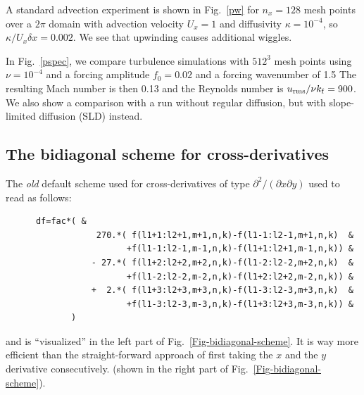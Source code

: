 \documentclass[\mydriver,12pt,twoside,notitlepage,a4paper]{article}
\begin{document}
A standard advection experiment is shown in Fig.~\ref{pw}
for $n_x=128$ mesh points over a $2\pi$ domain with
advection velocity $U_x=1$ and diffusivity $\kappa=10^{-4}$,
so $\kappa/U_x\delta x=0.002$.
We see that upwinding causes additional wiggles.

In Fig.~\ref{pspec}, we compare turbulence simulations with $512^3$
mesh points using $\nu=10^{-4}$ and a forcing amplitude $f_0=0.02$
and a forcing wavenumber of 1.5
The resulting Mach number is then 0.13 and the Reynolds number
is $u_{\rm rms}/\nu k_{\rm f}=900$.
We also show a comparison with a run without regular diffusion, but
with slope-limited diffusion (SLD) instead.

\subsection{The bidiagonal scheme for cross-derivatives}
\label{Bidiagonal}

The {\em old} default scheme used for cross-derivatives of type
$\partial^2/(\partial x \partial y)$ used to read as follows:
\begin{verbatim}
      df=fac*( &
                  270.*( f(l1+1:l2+1,m+1,n,k)-f(l1-1:l2-1,m+1,n,k)  &
                        +f(l1-1:l2-1,m-1,n,k)-f(l1+1:l2+1,m-1,n,k)) &
                 - 27.*( f(l1+2:l2+2,m+2,n,k)-f(l1-2:l2-2,m+2,n,k)  &
                        +f(l1-2:l2-2,m-2,n,k)-f(l1+2:l2+2,m-2,n,k)) &
                 +  2.*( f(l1+3:l2+3,m+3,n,k)-f(l1-3:l2-3,m+3,n,k)  &
                        +f(l1-3:l2-3,m-3,n,k)-f(l1+3:l2+3,m-3,n,k)) &
             )
\end{verbatim}
and is ``visualized'' in the left part of Fig.~\ref{Fig-bidiagonal-scheme}.
It is way more efficient than the straight-forward approach of first
taking the $x$ and the $y$ derivative consecutively.
(shown in the right part of Fig.~\ref{Fig-bidiagonal-scheme}).
\end{document}
